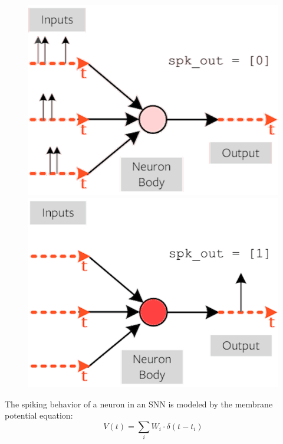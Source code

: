 \documentclass[11pt]{article}
\begin{document}
\begin{figure}[h]
  \centering
  \begin{minipage}{0.45\textwidth}
    \centering
    \includegraphics[width=1\textwidth]{image/def1.png}
  \end{minipage}\hfill
  \begin{minipage}{0.45\textwidth}
    \centering
    \includegraphics[width=1\textwidth]{image/def2.png}
  \end{minipage}
\end{figure}


The spiking behavior of a neuron in an SNN is modeled by the membrane potential equation:
$$
  V(t) = \sum_{i} W_i \cdot \delta(t - t_i)
$$
\end{document}
